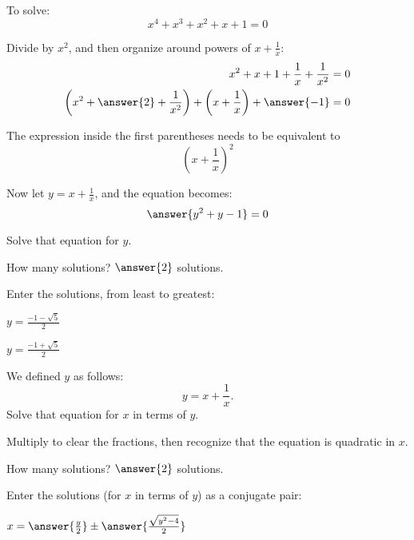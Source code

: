\documentclass[space,nooutcomes]{ximera}
\begin{document}
\begin{problem}

To solve: 
\[
x^4+x^3+x^2+x+1=0
\]

Divide by $x^2$, and then organize around powers of $x + \frac{1}{x}$: 
\begin{align*}
x^2+x+1+\frac{1}{x}+\frac{1}{x^2}&=0 \\
\left(x^2+ \answer{2} + \frac{1}{x^2}\right)+ \left(x+\frac{1}{x}\right)+\answer{-1}&=0 \\
\end{align*}
\begin{hint}
The expression inside the first parentheses needs to be equivalent to 
\[
\left(x+\frac{1}{x}\right)^2
\]
\end{hint}
\begin{problem}
Now let $y = x + \frac{1}{x}$, and the equation becomes: 
\[
\answer{y^2+y-1}=0
\]

Solve that equation for $y$.

How many solutions?  $\answer{2}$ solutions. 

\begin{problem}
Enter the solutions, from least to greatest: 

\begin{prompt}
$y = \frac{-1-\sqrt{5}}{2}$

$y = \frac{-1+\sqrt{5}}{2}$
\end{prompt}

\end{problem}
\end{problem}
\end{problem}

\begin{problem}
We defined $y$ as follows: 
\[
y = x + \frac{1}{x}.  
\]
Solve that equation for $x$ in terms of $y$.  
\begin{hint}
Multiply to clear the fractions, then recognize that the equation is quadratic in $x$.  
\end{hint}

How many solutions?  $\answer{2}$ solutions. 
\begin{problem}
\begin{prompt}
Enter the solutions (for $x$ in terms of $y$) as a conjugate pair: 

$x = \answer{\frac{y}{2}} \pm \answer{\frac{\sqrt{y^2-4}}{2}}$

\end{prompt}

\end{problem}
\end{problem}
\end{document}
